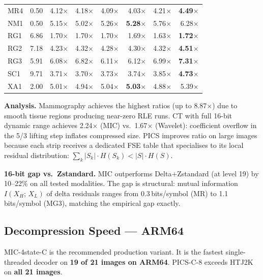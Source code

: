 \documentclass[10pt,twocolumn]{article}
\begin{document}
\begin{table}[t]
\begin{tabular}{lrrrrrrr}
MR4  & 0.50 & 4.12$\times$ & 4.18$\times$ & 4.09$\times$ & 4.03$\times$ & 4.21$\times$ & \textbf{4.49$\times$} \\
NM1  & 0.50 & 5.15$\times$ & 5.02$\times$ & 5.26$\times$ & \textbf{5.28$\times$} & 5.76$\times$ & 6.28$\times$ \\
RG1  & 6.86 & 1.70$\times$ & 1.70$\times$ & 1.70$\times$ & 1.69$\times$ & 1.63$\times$ & \textbf{1.72$\times$} \\
RG2  & 7.18 & 4.23$\times$ & 4.32$\times$ & 4.28$\times$ & 4.30$\times$ & 4.32$\times$ & \textbf{4.51$\times$} \\
RG3  & 5.91 & 6.08$\times$ & 6.82$\times$ & 6.11$\times$ & 6.12$\times$ & 6.99$\times$ & \textbf{7.31$\times$} \\
SC1  & 9.71 & 3.71$\times$ & 3.70$\times$ & 3.73$\times$ & 3.74$\times$ & 3.85$\times$ & \textbf{4.73$\times$} \\
XA1  & 2.00 & 5.01$\times$ & 4.94$\times$ & 5.04$\times$ & \textbf{5.03$\times$} & 4.88$\times$ & 5.39$\times$ \\
\bottomrule
\end{tabular}
\end{table}

\textbf{Analysis.} Mammography achieves the highest ratios (up to 8.87$\times$)
due to smooth tissue regions producing near-zero RLE runs. CT with full 16-bit
dynamic range achieves 2.24$\times$ (MIC) vs.\ 1.67$\times$ (Wavelet): coefficient
overflow in the 5/3 lifting step inflates compressed size. PICS improves ratio on
large images because each strip receives a dedicated FSE table that specialises to
its local residual distribution:
$\sum_k |S_k| \cdot H(S_k) < |S| \cdot H(S)$.

\textbf{16-bit gap vs.\ Zstandard.} MIC outperforms Delta+Zstandard (at level
19) by 10--22\% on all tested modalities. The gap is structural: mutual
information $I(X_H;\, X_L)$ of delta residuals ranges from 0.3\,bits/symbol
(MR) to 1.1\,bits/symbol (MG3), matching the empirical gap exactly.

\subsection{Decompression Speed --- ARM64}

MIC-4state-C is the recommended production variant. It is the fastest
single-threaded decoder on \textbf{19 of 21 images on ARM64}. PICS-C-8 exceeds
HTJ2K on \textbf{all 21 images}.
\end{document}
